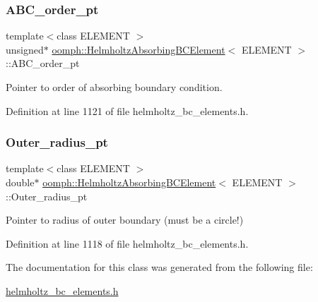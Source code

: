 \subsubsection{\texorpdfstring{A\+B\+C\+\_\+order\+\_\+pt}{ABC\_order\_pt}}
{\footnotesize\ttfamily template$<$class E\+L\+E\+M\+E\+NT $>$ \\
unsigned$\ast$ \hyperlink{classoomph_1_1HelmholtzAbsorbingBCElement}{oomph\+::\+Helmholtz\+Absorbing\+B\+C\+Element}$<$ E\+L\+E\+M\+E\+NT $>$\+::A\+B\+C\+\_\+order\+\_\+pt\hspace{0.3cm}{\ttfamily [private]}}



Pointer to order of absorbing boundary condition. 



Definition at line 1121 of file helmholtz\+\_\+bc\+\_\+elements.\+h.

\mbox{\label{classoomph_1_1HelmholtzAbsorbingBCElement_a45e39fb94adc88e2c92c0fb1ed27592e}} 
\subsubsection{\texorpdfstring{Outer\+\_\+radius\+\_\+pt}{Outer\_radius\_pt}}
{\footnotesize\ttfamily template$<$class E\+L\+E\+M\+E\+NT $>$ \\
double$\ast$ \hyperlink{classoomph_1_1HelmholtzAbsorbingBCElement}{oomph\+::\+Helmholtz\+Absorbing\+B\+C\+Element}$<$ E\+L\+E\+M\+E\+NT $>$\+::Outer\+\_\+radius\+\_\+pt\hspace{0.3cm}{\ttfamily [private]}}



Pointer to radius of outer boundary (must be a circle!) 



Definition at line 1118 of file helmholtz\+\_\+bc\+\_\+elements.\+h.



The documentation for this class was generated from the following file\+:\begin{DoxyCompactItemize}
\item 
\hyperlink{helmholtz__bc__elements_8h}{helmholtz\+\_\+bc\+\_\+elements.\+h}\end{DoxyCompactItemize}
